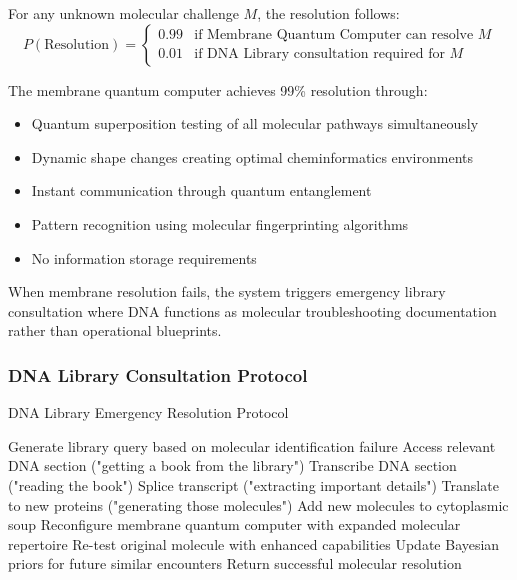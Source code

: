 ﻿\documentclass[11pt,a4paper]{article}
\begin{document}
\begin{definition}
For any unknown molecular challenge $M$, the resolution follows:
\begin{equation}
P(\text{Resolution}) = \begin{cases}
0.99 & \text{if Membrane Quantum Computer can resolve } M \\
0.01 & \text{if DNA Library consultation required for } M
\end{cases}
\end{equation}
\end{definition}

The membrane quantum computer achieves 99\% resolution through:
\begin{itemize}
\item Quantum superposition testing of all molecular pathways simultaneously
\item Dynamic shape changes creating optimal cheminformatics environments  
\item Instant communication through quantum entanglement
\item Pattern recognition using molecular fingerprinting algorithms
\item No information storage requirements
\end{itemize}

When membrane resolution fails, the system triggers emergency library consultation where DNA functions as molecular troubleshooting documentation rather than operational blueprints.

\subsubsection{DNA Library Consultation Protocol}

\begin{algorithm}
\caption{DNA Library Emergency Resolution Protocol}
\begin{algorithmic}
    \State Generate library query based on molecular identification failure
    \State Access relevant DNA section ("getting a book from the library")
    \State Transcribe DNA section ("reading the book")
    \State Splice transcript ("extracting important details")
    \State Translate to new proteins ("generating those molecules")
    \State Add new molecules to cytoplasmic soup
    \State Reconfigure membrane quantum computer with expanded molecular repertoire
    \State Re-test original molecule with enhanced capabilities
    \State Update Bayesian priors for future similar encounters
    \State Return successful molecular resolution
\EndProcedure
\end{algorithmic}
\end{algorithm}
\end{document}
